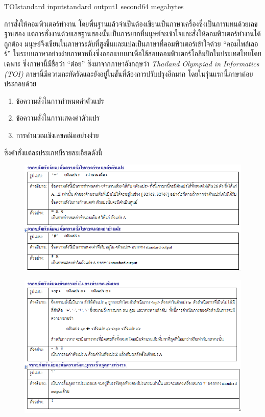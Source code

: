 \documentclass[11pt,a4paper]{article}
\begin{document}
\begin{problem}{TOI}{standard input}{standard output}{1 second}{64 megabytes}

การสั่งให้คอมพิวเตอร์ทำงาน โดยพื้นฐานแล้วจำเป็นต้องเขียนเป็นภาษาเครื่องซึ่งเป็นการแทนด้วยเลขฐานสอง แต่การสั่งงานด้วยเลขฐานสองนั้นเป็นการยากที่มนุษย์จะเข้าใจและสั่งให้คอมพิวเตอร์ทำงานได้ถูกต้อง มนุษย์จึงเขียนในภาษาระดับที่สูงขึ้นและแปลเป็นภาษาที่คอมพิวเตอร์เข้าใจด้วย “คอมไพล์เลอร์” ในระบบภาษาอย่างง่ายภาษาหนึ่งซึ่งออกแบบมาเพื่อใช้สอบคอมพิวเตอร์โอลิมปิกในประเทศไทยโดยเฉพาะ ซึ่งภาษานี้มีชื่อว่า “ต๋อย” ซึ่งมาจากภาษาอังกฤษว่า \textit{Thailand Olympiad in Informatics (TOI)} ภาษานี้มีความกะทัดรัดและยังอยู่ในขั้นที่ต้องการปรับปรุงอีกมาก โดยในรุ่นแรกนี้ภาษาต๋อยประกอบด้วย
\begin{enumerate}

\item ข้อความสั่งในการกำหนดค่าตัวแปร
\item ข้อความสั่งในการแสดงค่าตัวแปร
\item การคำนวณเชิงเลขคณิตอย่างง่าย
\end{enumerate}

ซึ่งคำสั่งแต่ละประเภทมีรายละเอียดดังนี้


\begin{figure}[h]
\centering
\includegraphics[width=1\textwidth]{../latex/img/1028/1028-1.png}
\end{figure}
\begin{figure}[h]
\centering
\includegraphics[width=1\textwidth]{../latex/img/1028/1028-2.png}
\end{figure}
\newpage


\end{problem}
\end{document}
